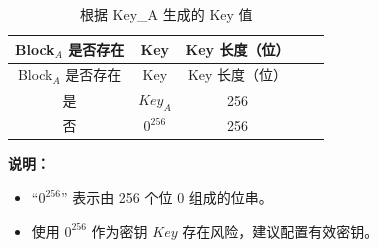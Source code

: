 \begin{longtable}[c]{ |c|c|c|c|c| }
\caption{根据 Key\_A 生成的 Key 值}
\label{tab:extmemencr-key-possibility}
\\\hline 
\rowcolor{lightgray}
Block$_A$ 是否存在 & Key & Key 长度（位） \\\hline
\endfirsthead
\hline
\rowcolor{lightgray}
Block$_A$ 是否存在 & Key & Key 长度（位） \\\hline
\endhead
\endfoot
是       &   $\mathit{Key}_{A}$    &   256   \\\hline
否        &   $0^{256}$    &   256   \\\hline
\end{longtable}
\vspace{-1.5em}
{\bfseries 说明：}\\
\begin{itemize}
    \item “$0^{256}$” 表示由 256 个位 0 组成的位串。
    \item 使用 $0^{256}$ 作为密钥 $\mathit{Key}$ 存在风险，建议配置有效密钥。
\end{itemize}